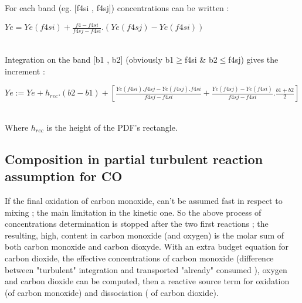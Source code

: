 For each band (eg. [f4si , f4sj]) concentrations can be written :\\
\centerline{$Ye = Ye(f4si) + \frac{f4-f4si}{f4sj-f4si} . \left( Ye(f4sj)-Ye(f4si) \right) $}\\ 
Integration on the band [b1 , b2] ({\small obviously b1$\geq$f4si \&
b2$\leq$f4sj}) gives the increment :\\
\centerline{$Ye := Ye + h_{rec}.(b2-b1) + \left[ \frac{Ye(f4si).f4sj-Ye(f4sj).f4si}{f4sj-f4si}+\frac{Ye(f4sj)-Ye(f4si)}{f4sj-f4si}.\frac{b1+b2}{2} \right] $}\\
Where $h_{rec}$ is the height of the PDF's rectangle. 

 
 

\subsection{Composition in partial turbulent reaction assumption for CO}

If the final oxidation of carbon monoxide, can't be assumed fast in
respect to mixing ; the main limitation in the kinetic one. So the
above process of concentrations determination is stopped after the two
first reactions ; the resulting, high, content in carbon monoxide
({\small and oxygen}) is the molar sum of both carbon monoxide and
carbon dioxyde. With an extra budget equation for carbon dioxide, the
effective concentrations of carbon monoxide ({\small difference
between "turbulent" integration and transported "already" consumed }),
oxygen and carbon dioxide can be computed, then a reactive source term
for oxidation ({\small of carbon monoxide}) and dissociation ({\small
of carbon dioxide}).

\newpage




